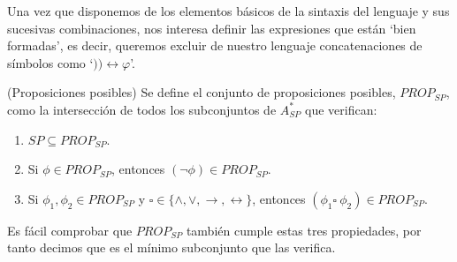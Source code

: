 Una vez que disponemos de los elementos básicos de la sintaxis del lenguaje y sus sucesivas combinaciones, nos interesa definir las expresiones que están `bien formadas', es decir, queremos excluir de nuestro lenguaje  concatenaciones de símbolos como `$)) \leftrightarrow \varphi$'.

\begin{definition}\label{def:PROP_{SP}}(Proposiciones posibles)
Se define el conjunto de proposiciones posibles,  $PROP_{SP}$, como la intersección de todos los subconjuntos de $A_{SP}^*$ que verifican:
\begin{enumerate}
    \item $SP \subseteq PROP_{SP}$.
    \item Si $\phi\in PROP_{SP}$, entonces $(\neg \phi) \in PROP_{SP} $.
    \item Si $\phi_1, \phi_2 \in PROP_{SP}$ y $\square\in \{\land, \lor, \rightarrow, \leftrightarrow\}$, entonces $(\phi_1 \square\  \phi_2) \in PROP_{SP}$.
\end{enumerate}
\end{definition}
Es fácil comprobar que $PROP_{SP}$ también cumple estas tres propiedades, por tanto decimos que es el mínimo subconjunto que las verifica.

